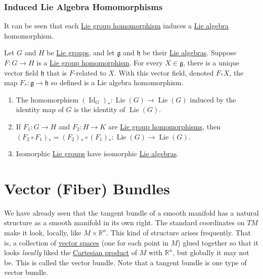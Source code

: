 \documentclass{article}
\DeclareMathOperator{\Id}{Id}
\DeclareMathOperator{\Lie}{Lie}
\newcounter{theorem}[section]
\begin{document}
    \subsubsection{Induced Lie Algebra Homomorphisms}

      It can be seen that each \hyperref[def:lie-group-homomorphism]{Lie group homomorphism} induces a \hyperref[def:lie-algebra]{Lie algebra} homomorphism. 

      \begin{theorem}
        \label{thm:induced-lie-algebra-homomorphism}
      Let $G$ and $H$ be \hyperref[def:lie-group]{Lie groups}, and let $\mathfrak{g}$ and $\mathfrak{h}$ be their \hyperref[def:lie-algebra]{Lie algebras}. Suppose $F: G \to H$ is a \hyperref[def:lie-group-homomorphism]{Lie group homomorphism}. For every $X \in \mathfrak{g}$, there is a unique vector field $\mathfrak{h}$ that is $F$-related to $X$. With this vector field, denoted $F_* X$, the map $F_*: \mathfrak{g} \to \mathfrak{h}$ so defined is a Lie algebra homomorphism. 
      \end{theorem}

      \begin{lemma}
        \label{thm:properties-of-the-induced-homomorphism}
      \begin{enumerate}
          \item The homomorphism $(\Id_G)_* : \Lie (G) \to \Lie(G)$ induced by the identity map of $G$ is the identity of $\Lie(G)$. 
          \item If $F_1: G \to H$ and $F_2: H \to K$ are \hyperref[def:lie-group-homomorphism]{Lie group homomorphisms}, then $(F_2 \circ F_1)_* = (F_2)_* \circ (F_1)_* : \Lie(G) \to \Lie(G)$. 
          \item Isomorphic \hyperref[def:lie-group]{Lie groups} have isomorphic \hyperref[def:lie-algebra]{Lie algebras}. 
      \end{enumerate}
      \end{lemma}

\section{Vector (Fiber) Bundles}

  We have already seen that the tangent bundle of a smooth manifold has a natural structure as a smooth manifold in its own right. The standard coordinates on $TM$ make it look, locally, like $M \times \mathbb{R}^n$. This kind of structure arises frequently. That is, a collection of \hyperref[lin-def:vector-space]{vector spaces} (one for each point in $M$) glued together so that it looks \textit{locally} liked the \hyperref[st-def:cart-prod-2]{Cartesian product} of $M$ with $\mathbb{R}^n$, but globally it may not be. This is called the vector bundle. Note that a tangent bundle is one type of vector bundle. 
\end{document}
